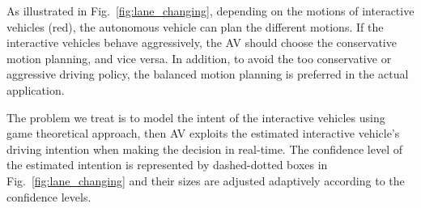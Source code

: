 \documentclass[10pt,journal]{IEEEtran}
\begin{document}
	As illustrated in Fig.~\ref{fig:lane_changing}, depending on the motions of interactive vehicles (red), the autonomous vehicle can plan the different motions. If the interactive vehicles behave aggressively, the AV should choose the conservative motion planning, and vice versa. In addition, to avoid the too conservative or aggressive driving policy, the balanced motion planning is preferred in the actual application.
	
	The problem we treat is to model the intent of the interactive vehicles using game theoretical approach, then AV exploits the estimated interactive vehicle's driving intention when making the decision in real-time. The confidence level of the estimated intention is represented by dashed-dotted boxes in Fig.~\ref{fig:lane_changing} and their sizes are adjusted adaptively according to the confidence levels.
\end{document}
